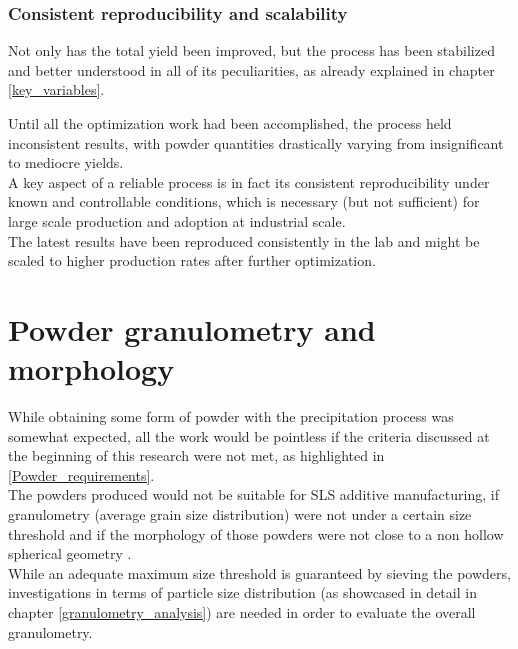 \documentclass{article}
\begin{document}
        \subsubsection{Consistent reproducibility and scalability\label{consistent_reproducibility}}

        Not only has the total yield been improved, but the process has been stabilized and better understood in all of its 
        peculiarities, as already explained in chapter \ref{key_variables}. 

        Until all the optimization work had been accomplished, the process held inconsistent results, with powder quantities drastically 
        varying from insignificant to mediocre yields. \\ 

        A key aspect of a reliable process is in fact its consistent reproducibility under known and controllable conditions, 
        which is necessary (but not sufficient) for large scale production and adoption at industrial scale. \\ 

        The latest results have been reproduced consistently in the lab and might be scaled to higher production rates after 
        further optimization. \\ 




    \clearpage
    \section{Powder granulometry and morphology\label{powder_granulometry_morphology}} 

    While obtaining some form of powder with the precipitation process was somewhat expected, all the work would be 
    pointless if the criteria discussed at the beginning of this research were not met, as highlighted in \ref{Powder_requirements}. \\ 

    The powders produced would not be suitable for SLS additive manufacturing, if granulometry (average grain size distribution)
    were not under a certain size threshold and if the morphology of those powders were not close to a non hollow spherical geometry 
    \autocites{Padovano_SLS_Review}. \\

    While an adequate maximum size threshold is guaranteed by sieving the powders,
    investigations in terms of particle size distribution (as showcased in detail in chapter \ref{granulometry_analysis})
    are needed in order to evaluate the overall granulometry. 
    
\end{document}
